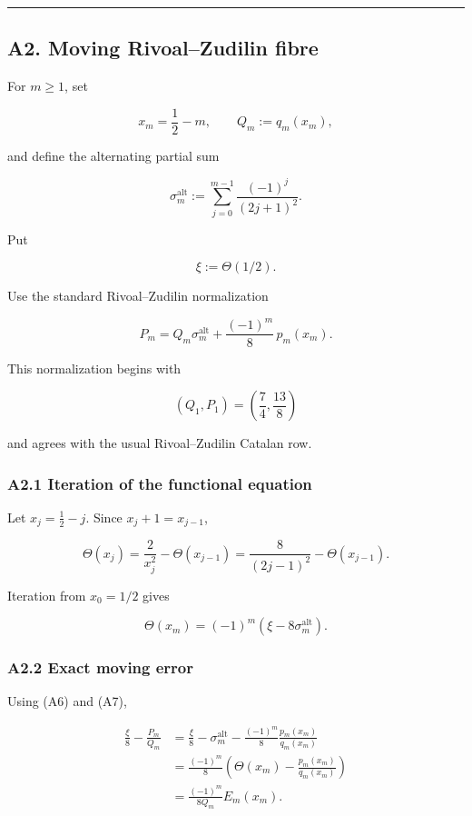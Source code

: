 \documentclass[
  10pt,
  letterpaper,
]{article}
\theoremstyle{definition}
\theoremstyle{remark}
\begin{document}
\begin{center}\rule{0.5\linewidth}{0.5pt}\end{center}

\subsection{A2. Moving Rivoal--Zudilin
fibre}\label{a2.-moving-rivoalzudilin-fibre}

For \(m\ge1\), set

\[
x_m=\frac12-m,
\qquad
Q_m:=q_m(x_m),
\]

and define the alternating partial sum

\[
\sigma_m^{\mathrm{alt}}
:=
\sum_{j=0}^{m-1}\frac{(-1)^j}{(2j+1)^2}.
\]

Put

\[
\xi:=\Theta(1/2).
\]

Use the standard Rivoal--Zudilin normalization

\[
\boxed{
P_m
=
Q_m\sigma_m^{\mathrm{alt}}
+
\frac{(-1)^m}{8}\,p_m(x_m).
}
\tag{A6}
\]

This normalization begins with

\[
(Q_1,P_1)=\left(\frac74,\frac{13}{8}\right)
\]

and agrees with the usual Rivoal--Zudilin Catalan row.

\subsubsection{A2.1 Iteration of the functional
equation}\label{a2.1-iteration-of-the-functional-equation}

Let \(x_j=\frac12-j\). Since \(x_j+1=x_{j-1}\),

\[
\Theta(x_j)
=
\frac{2}{x_j^2}-\Theta(x_{j-1})
=
\frac{8}{(2j-1)^2}-\Theta(x_{j-1}).
\]

Iteration from \(x_0=1/2\) gives

\[
\boxed{
\Theta(x_m)
=
(-1)^m
\left(
\xi-8\sigma_m^{\mathrm{alt}}
\right).
}
\tag{A7}
\]

\subsubsection{A2.2 Exact moving error}\label{a2.2-exact-moving-error}

Using (A6) and (A7),

\[
\begin{aligned}
\frac{\xi}{8}-\frac{P_m}{Q_m}
&=
\frac{\xi}{8}
-
\sigma_m^{\mathrm{alt}}
-
\frac{(-1)^m}{8}\frac{p_m(x_m)}{q_m(x_m)}
\\
&=
\frac{(-1)^m}{8}
\left(
\Theta(x_m)-\frac{p_m(x_m)}{q_m(x_m)}
\right)
\\
&=
\frac{(-1)^m}{8Q_m}E_m(x_m).
\end{aligned}
\tag{A8}
\]
\end{document}
